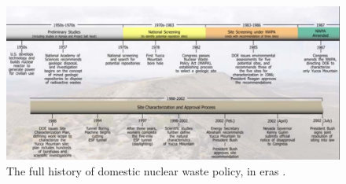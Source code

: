 \begin{figure}[htbp!]
  \begin{center}
    \includegraphics{timeline.eps}
  \end{center}
  \caption{The full history of domestic nuclear waste policy, in eras 
    \cite{peters_what_2013}.}
  \label{fig:timeline}
\end{figure}
